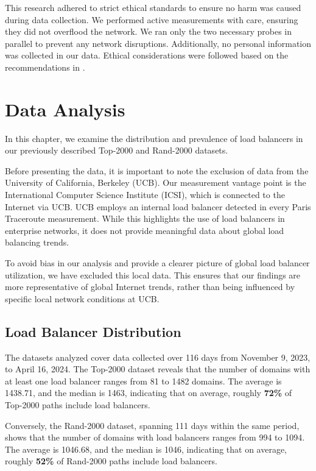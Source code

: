 \documentclass[12pt]{cwru_thesis}
\begin{document}
This research adhered to strict ethical standards to ensure no harm was caused during data collection. We performed active measurements with care, ensuring they did not overflood the network. We ran only the two necessary probes in parallel to prevent any network disruptions. Additionally, no personal information was collected in our data. Ethical considerations were followed based on the recommendations in  \cite{partridge2016ethical}.



\chapter{Data Analysis}

In this chapter, we examine the distribution and prevalence of load balancers in our previously described Top-2000 and Rand-2000 datasets.

Before presenting the data, it is important to note the exclusion of data from the University of California, Berkeley (UCB). Our measurement vantage point is the International Computer Science Institute (ICSI), which is connected to the Internet via UCB. UCB employs an internal load balancer detected in every Paris Traceroute measurement. While this highlights the use of load balancers in enterprise networks, it does not provide meaningful data about global load balancing trends.

To avoid bias in our analysis and provide a clearer picture of global load balancer utilization, we have excluded this local data. This ensures that our findings are more representative of global Internet trends, rather than being influenced by specific local network conditions at UCB.

\section{Load Balancer Distribution}

The datasets analyzed cover data collected over 116 days from November 9, 2023, to April 16, 2024. The Top-2000 dataset reveals that the number of domains with at least one load balancer ranges from 81 to 1482 domains. The average is 1438.71, and the median is 1463, indicating that on average, roughly \textbf{72\%} of Top-2000 paths include load balancers.

Conversely, the Rand-2000 dataset, spanning 111 days within the same period, shows that the number of domains with load balancers ranges from 994 to 1094. The average is 1046.68, and the median is 1046, indicating that on average, roughly \textbf{52\%} of Rand-2000 paths include load balancers. 
\end{document}

